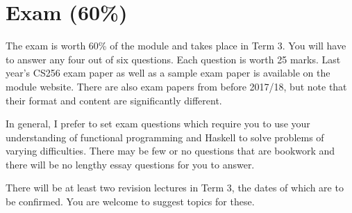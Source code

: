 \section{Exam (60\%)}

The exam is worth 60\% of the module and takes place in Term 3. You will have to answer any four out of six questions. Each question is worth 25 marks. Last year's CS256 exam paper as well as a sample exam paper is available on the module website. There are also exam papers from before 2017/18, but note that their format and content are significantly different.

In general, I prefer to set exam questions which require you to use your understanding of functional programming and Haskell to solve problems of varying difficulties. There may be few or no questions that are bookwork and there will be no lengthy essay questions for you to answer.

There will be at least two revision lectures in Term 3, the dates of which are to be confirmed. You are welcome to suggest topics for these.